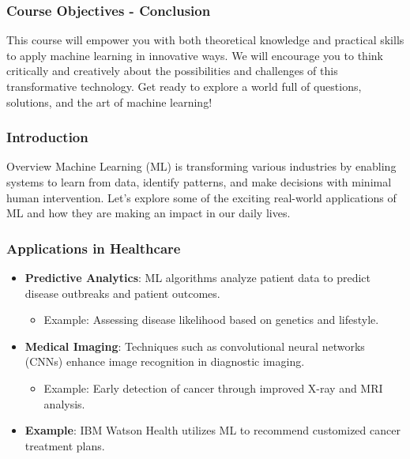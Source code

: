 \documentclass[aspectratio=169]{beamer}
\begin{document}
\begin{frame}[fragile]
    \frametitle{Course Objectives - Conclusion}
    This course will empower you with both theoretical knowledge and practical skills to apply machine learning in innovative ways. 
    We will encourage you to think critically and creatively about the possibilities and challenges of this transformative technology. 
    Get ready to explore a world full of questions, solutions, and the art of machine learning!
\end{frame}

\begin{frame}[fragile]
    \frametitle{Introduction}
    \begin{block}{Overview}
        Machine Learning (ML) is transforming various industries by enabling systems to learn from data, identify patterns, and make decisions with minimal human intervention. Let’s explore some of the exciting real-world applications of ML and how they are making an impact in our daily lives.
    \end{block}
\end{frame}

\begin{frame}[fragile]
    \frametitle{Applications in Healthcare}
    \begin{itemize}
        \item \textbf{Predictive Analytics}: 
            ML algorithms analyze patient data to predict disease outbreaks and patient outcomes.
            \begin{itemize}
                \item Example: Assessing disease likelihood based on genetics and lifestyle.
            \end{itemize}
        \item \textbf{Medical Imaging}: 
            Techniques such as convolutional neural networks (CNNs) enhance image recognition in diagnostic imaging.
            \begin{itemize}
                \item Example: Early detection of cancer through improved X-ray and MRI analysis.
            \end{itemize}
        \item \textbf{Example}:
            IBM Watson Health utilizes ML to recommend customized cancer treatment plans.
    \end{itemize}
\end{frame}
\end{document}
